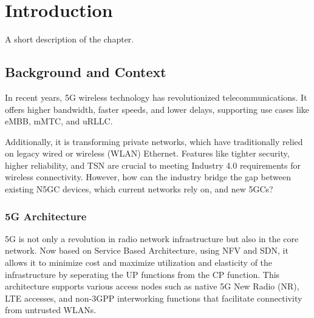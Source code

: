 \chapter{Introduction}%
\label{chapter:introduction}

\begin{introduction}
A short description of the chapter.
\end{introduction}

\section{Background and Context}


In recent years, \ac{5G} wireless technology has revolutionized telecommunications. It offers higher bandwidth, faster speeds, and lower delays, supporting use cases like \ac{eMBB}, \ac{mMTC}, and \ac{uRLLC}.

Additionally, it is transforming private networks, which have traditionally relied on legacy wired or wireless (WLAN) Ethernet. Features like tighter security, higher reliability, and \ac{TSN} are crucial to meeting Industry 4.0 requirements for wireless connectivity. However, how can the industry bridge the gap between existing \ac{N5GC} devices, which current networks rely on, and new \acp{5GC}?

\subsection{5G Architecture}


5G is not only a revolution in radio network infrastructure but also in the core network. Now based on Service Based Architecture, using \ac{NFV} and \ac{SDN}, it allows it to minimize cost and maximize utilization and elasticity of the infrastructure by seperating the \ac{UP} functions from the \ac{CP} function. This architecture supports various access nodes such as native 5G New Radio (NR), LTE accesses, and non-3GPP interworking functions that facilitate connectivity from untrusted WLANs.~\cite{23.501}


